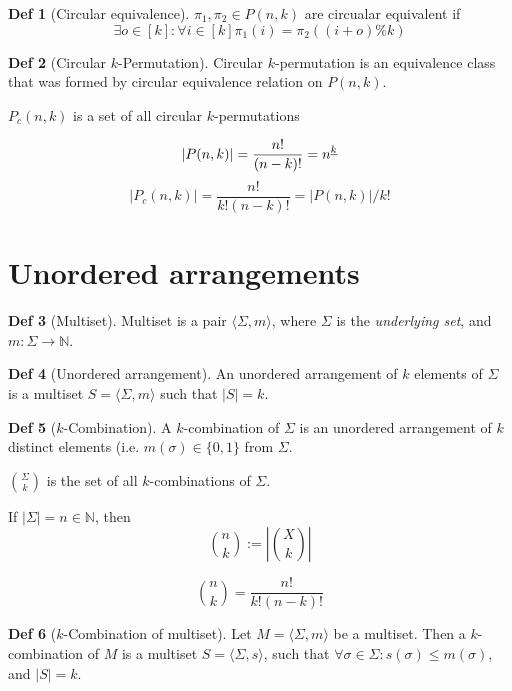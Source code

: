 \documentclass[a4paper]{article}
\theoremstyle{definition}
\newtheorem{definition}{Def}
\begin{document}
\begin{definition}[Circular equivalence]
  \(\pi_1, \pi_2 \in P(n, k)\) are circualar equivalent if
  \[\exists o \in [k] : \forall i \in [k] \pi_1(i) = \pi_2((i + o) \% k) \]
\end{definition}

\begin{definition}[Circular \(k\)-Permutation]
  Circular \(k\)-permutation is an equivalence class that was formed
  by circular equivalence relation on \(P(n, k)\).
\end{definition}

\(P_c(n, k)\) is a set of all circular \(k\)-permutations

\[|P(n, k)| = \frac{n!}{(n - k)!} = {n}^{\underline{k}}\]
\[|P_c(n, k)| = \frac{n!}{k! (n - k)!} = |P(n, k)| / k!\]

\section{Unordered arrangements}

\begin{definition}[Multiset]
  Multiset is a pair \( \langle \Sigma, m \rangle \),
  where \(\Sigma\) is the \textit{underlying set},
  and \(m : \Sigma \to \mathbb{N}\).
\end{definition}

\begin{definition}[Unordered arrangement]
  An unordered arrangement of \(k\) elements of \(\Sigma\)
  is a multiset \(S = \langle \Sigma, m \rangle\) such that \(|S| = k\).
\end{definition}

\begin{definition}[\(k\)-Combination]
  A \(k\)-combination of \(\Sigma\) is an unordered arrangement of \(k\)
  distinct elements (i.e. \(m(\sigma) \in \{0, 1\}\) from \(\Sigma\).
\end{definition}

\(\binom{\Sigma}{k}\) is the set of all \(k\)-combinations of \(\Sigma\).

If \(|\Sigma| = n \in \mathbb{N}\), then
\[\binom{n}{k} := \left|\binom{X}{k}\right|\]

\[\binom{n}{k} = \frac{n!}{k!(n-k)!}\]

\begin{definition}[\(k\)-Combination of multiset]
  Let \(M = \langle \Sigma, m \rangle\) be a multiset.
  Then a \(k\)-combination of \(M\) is a multiset
  \(S = \langle \Sigma, s \rangle\), such that
  \(\forall \sigma \in \Sigma : s(\sigma) \le m(\sigma)\),
  and \(|S| = k\).
\end{definition}
\end{document}
